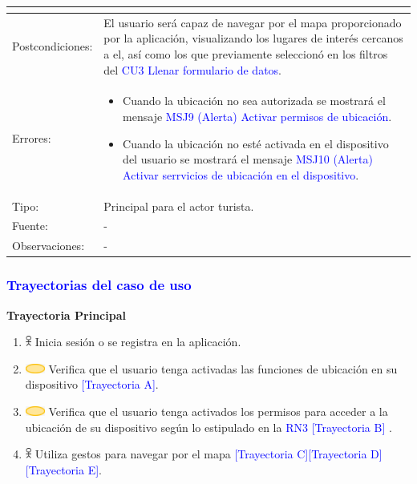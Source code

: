 \begin{tabularx}{16cm}{||l|X||}
{\begin{itemize}
        \end{itemize}}\\ 
	\hline
	{Postcondiciones:} & {El usuario será capaz de navegar por el mapa proporcionado por la aplicación, visualizando los lugares de interés cercanos a el, así como los que previamente seleccionó en los filtros del {\textcolor{blue}{CU3 Llenar formulario de datos}}.}\\
	\hline
	{Errores:} & \begin{itemize}
            \item Cuando la ubicación no sea autorizada se mostrará el mensaje {\textcolor{blue}{MSJ9 (Alerta) Activar permisos de ubicación}}.
            \item Cuando la ubicación no esté activada en el dispositivo del usuario se mostrará el mensaje {\textcolor{blue}{MSJ10 (Alerta) Activar serrvicios de ubicación en el dispositivo}}.
        \end{itemize} \\
	\hline
	{Tipo:} & {Principal para el actor turista.}\\
	\hline
	{Fuente:} & {-} \\
	\hline
	{Observaciones:} & {-} \\
	\hline
\end{tabularx}

\pagebreak
\subsubsection{\textcolor{blue}{Trayectorias del caso de uso}}
\textbf{Trayectoria Principal}
    \begin{enumerate}
        \item \includegraphics[width=0.0150\textwidth]{Figuras/persona.png} Inicia sesión o se registra en la aplicación.
        \item \includegraphics[width=0.0500\textwidth]{Figuras/sistema.png} Verifica que el usuario tenga activadas las funciones de ubicación en su dispositivo {\textcolor{blue}{[Trayectoria A]}}.
        \item \includegraphics[width=0.0500\textwidth]{Figuras/sistema.png} Verifica que el usuario tenga activados los permisos para acceder a la ubicación de su dispositivo según lo estipulado en la {\textcolor{blue}{RN3}} {\textcolor{blue}{[Trayectoria B]}} .
        \item \includegraphics[width=0.0150\textwidth]{Figuras/persona.png} Utiliza gestos para navegar por el mapa \textcolor{blue}{[Trayectoria C][Trayectoria D][Trayectoria E]}.
    \end{enumerate}

